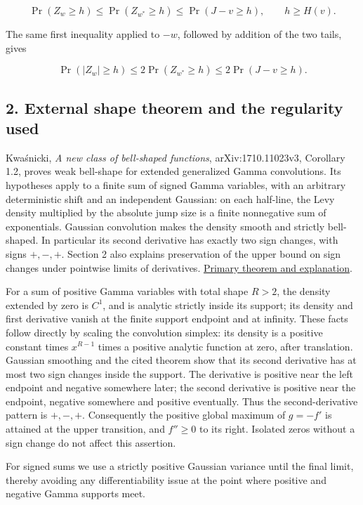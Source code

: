 \documentclass[10pt,a4paper]{article}
\begin{document}
\[
\Pr(Z_w\ge h)\le\Pr(Z_{w^*}\ge h)
\le\Pr(J-v\ge h),\qquad h\ge H(v).                 \tag{1}
\]

The same first inequality applied to \(-w\), followed by addition of the
two tails, gives

\[
\Pr(|Z_w|\ge h)\le2\Pr(Z_{w^*}\ge h)
\le2\Pr(J-v\ge h).                                \tag{2}
\]

\subsection{2. External shape theorem and the regularity
used}\label{external-shape-theorem-and-the-regularity-used}

Kwaśnicki, \emph{A new class of bell-shaped functions},
arXiv:1710.11023v3, Corollary 1.2, proves weak bell-shape for extended
generalized Gamma convolutions. Its hypotheses apply to a finite sum of
signed Gamma variables, with an arbitrary deterministic shift and an
independent Gaussian: on each half-line, the Levy density multiplied by
the absolute jump size is a finite nonnegative sum of exponentials.
Gaussian convolution makes the density smooth and strictly bell-shaped.
In particular its second derivative has exactly two sign changes, with
signs \(+,-,+\). Section 2 also explains preservation of the upper bound
on sign changes under pointwise limits of derivatives.
\href{https://arxiv.org/html/1710.11023v3}{Primary theorem and
explanation}.

For a sum of positive Gamma variables with total shape \(R>2\), the
density extended by zero is \(C^1\), and is analytic strictly inside its
support; its density and first derivative vanish at the finite support
endpoint and at infinity. These facts follow directly by scaling the
convolution simplex: its density is a positive constant times
\(x^{R-1}\) times a positive analytic function at zero, after
translation. Gaussian smoothing and the cited theorem show that its
second derivative has at most two sign changes inside the support. The
derivative is positive near the left endpoint and negative somewhere
later; the second derivative is positive near the endpoint, negative
somewhere and positive eventually. Thus the second-derivative pattern is
\(+,-,+\). Consequently the positive global maximum of \(g=-f'\) is
attained at the upper transition, and \(f''\ge0\) to its right. Isolated
zeros without a sign change do not affect this assertion.

For signed sums we use a strictly positive Gaussian variance until the
final limit, thereby avoiding any differentiability issue at the point
where positive and negative Gamma supports meet.
\end{document}
